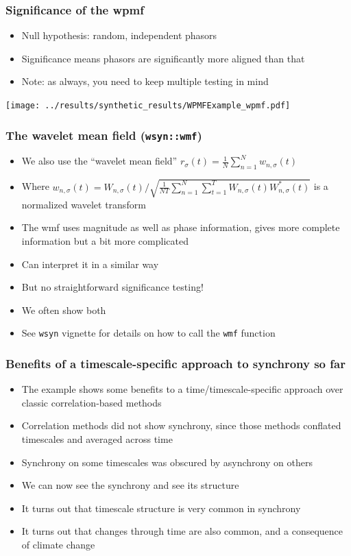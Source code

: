 \documentclass{beamer}
\begin{document}
\begin{frame}
\frametitle{Significance of the wpmf}
\begin{itemize}
\item Null hypothesis: random, independent phasors
\item Significance means phasors are significantly more aligned than that
\item Note: as always, you need to keep multiple testing in mind
\end{itemize}
\begin{center}
\texttt{[image: ../results/synthetic\_results/WPMFExample\_wpmf.pdf]}
\end{center}
\end{frame}

\begin{frame}
\frametitle{The wavelet mean field (\texttt{wsyn::wmf})}
  \begin{itemize}
    \item We also use the ``wavelet mean field'' $r_\sigma(t)=\frac{1}{N}\sum_{n=1}^{N}w_{n,\sigma}(t)$
    \item Where $w_{n,\sigma}(t)=W_{n,\sigma}(t)/\sqrt{\frac{1}{NT}\sum_{n=1}^{N}\sum_{t=1}^{T}W_{n,\sigma}(t)W_{n,\sigma}^{*}(t)}$ is a normalized wavelet transform
    \item The wmf uses magnitude as well as phase information, gives more complete information but a bit more complicated
    \item Can interpret it in a similar way
    \item But no straightforward significance testing!
    \item We often show both
    \item See \texttt{wsyn} vignette for details on how to call the \texttt{wmf} function
  \end{itemize}
\end{frame}

{
\begin{frame}
\frametitle{Benefits of a timescale-specific approach to synchrony so far}
\begin{itemize}
\item The example shows some benefits to a time/timescale-specific approach over classic correlation-based methods
\item Correlation methods did not show synchrony, since those methods conflated timescales and averaged across time
\item Synchrony on some timescales was obscured by asynchrony on others
\item We can now see the synchrony and see its structure
\item It turns out that timescale structure is very common in synchrony
\item It turns out that changes through time are also common, and a consequence of climate change
\end{itemize}
\end{frame}}
\end{document}
